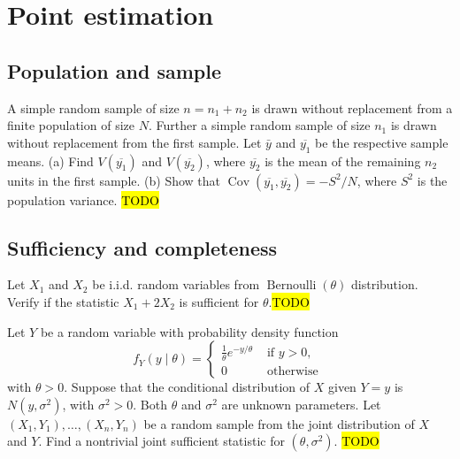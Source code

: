 
\chapter{Point estimation\label{chap:pointEstimation}}

\section{Population and sample}

\begin{example}
\label{exa:isi2009samplepsb11}
A simple random sample of size $n=n_1+n_2$ is drawn without replacement from a finite population of size $N$. Further a simple random sample of size $n_1$ is drawn without replacement from the first sample. Let $\bar{y}$ and $\overline{y_1}$ be the respective sample means.
(a) Find $V\left(\overline{y_1}\right)$ and $V\left(\overline{y_2}\right)$, where $\overline{y_2}$ is the mean of the remaining $n_2$ units in the first sample.
(b) Show that $\operatorname{Cov}\left(\overline{y_1}, \overline{y_2}\right)=-S^2 / N$, where $S^2$ is the population variance.
\hl{TODO}
\end{example}

\section{Sufficiency and completeness}
\begin{example}
\label{exa:isi2007samplepsb9}Let $X_{1}$ and $X_{2}$ be i.i.d.
random variables from $\operatorname{Bernoulli}(\theta)$ distribution.
Verify if the statistic $X_{1}+2X_{2}$ is sufficient for $\theta$.\hl{TODO}
\end{example}

\begin{example}
\label{exa:isi2006samplepsb7}Let $Y$ be a random variable with probability
density function 
\[
f_{Y}(y\mid\theta)=\begin{cases}
\frac{1}{\theta}e^{-y/\theta} & \text{ if }y>0,\\
0 & \text{ otherwise }
\end{cases}
\]
 with $\theta>0$. Suppose that the conditional distribution of $X$
given $Y=y$ is $N\left(y,\sigma^{2}\right)$, with $\sigma^{2}>0$.
Both $\theta$ and $\sigma^{2}$ are unknown parameters. Let $\left(X_{1},Y_{1}\right),\ldots,\left(X_{n},Y_{n}\right)$
be a random sample from the joint distribution of $X$ and $Y$. Find
a nontrivial joint sufficient statistic for $\left(\theta,\sigma^{2}\right)$.
\hl{TODO}
\end{example}

